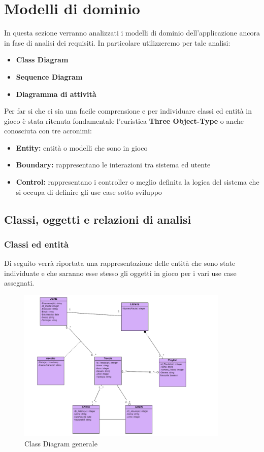 \documentclass{article}
\begin{document}
	\section{Modelli di dominio}
	In questa sezione verranno analizzati i modelli di dominio dell'applicazione ancora in fase di analisi dei requisiti.
	In particolare utilizzeremo per tale analisi:
	\begin{itemize}
		\item \textbf{Class Diagram}
		\item \textbf{Sequence Diagram}
		\item \textbf{Diagramma di attività}
	\end{itemize}
	Per far si che ci sia una facile comprensione e per individuare classi ed entità in gioco è stata ritenuta fondamentale l’euristica\textbf{ Three Object-Type} o anche conosciuta con tre acronimi:
	\begin{itemize}
		\item \textbf{ Entity:} entità o modelli che sono in gioco
		\item \textbf{Boundary:} rappresentano le interazioni tra sistema ed utente
		\item \textbf{Control:} rappresentano i controller o meglio definita la logica del sistema che si occupa di definire gli use case sotto sviluppo
	\end{itemize}
		\subsection{Classi, oggetti e relazioni di analisi}
			\subsubsection{Classi ed entità}
			Di seguito verrà riportata una rappresentazione delle entità che sono state individuate e che saranno esse stesso gli oggetti in gioco per i vari use case assegnati.
			\begin{figure}[H]
				\centering
				\includegraphics[width=0.9\textwidth]{Immagini/classdiagramgenerale}
				\caption{Class Diagram generale}
			\end{figure}
\end{document}

